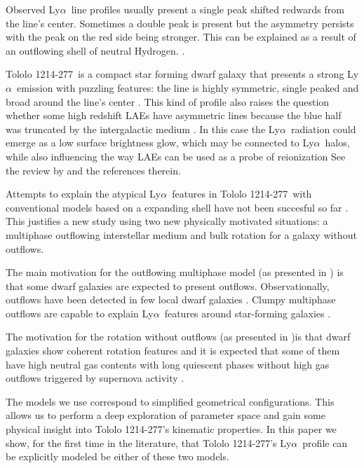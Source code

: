 \documentclass[a4,useAMS,usenatbib,usegraphicx]{mn2e}
\newcommand{\tol}{Tololo 1214-277}
\newcommand{\lya}{Ly$\alpha$}
\begin{document}
Observed \lya\ line profiles usually present a single peak shifted
redwards from the line's center. 
Sometimes a double peak is present but the asymmetry persists with 
the peak on the red side being stronger. 
This can be explained as a result of an outflowing shell of neutral Hydrogen.
\citep{2006A&A...460..397V,Orsi12,2012ApJ...751...29Y,2015ApJ...812..123G}.

\tol\ is a compact star forming dwarf galaxy that presents a
strong \lya\ emission with puzzling 
features: the line is highly symmetric, single peaked and broad around the
line's center \citep{Thuan97}.
This kind of profile also raises the question whether some high
redshift LAEs have asymmetric lines because the blue half was
truncated by the intergalactic medium \citep{2007MNRAS.377.1175D}. 
In this case the \lya\ radiation could emerge as a low surface
brightness glow, which may be connected to \lya\ halos, while also
influencing the way LAEs can be used as a probe of reionization
See the review by \cite{2014PASA...31...40D} and the references therein.

Attempts to explain the atypical \lya\ features in \tol\ with
conventional models based on a expanding shell have not been succesful
so far \citep{mashesse03,2015A&A...578A...7V}. 
This justifies a new study using two new physically motivated
situations: a multiphase outflowing interstellar medium and bulk rotation for a
galaxy without outflows.

The main motivation for the outflowing multiphase model (as presented
in \cite{Gronke2016}) is that some dwarf galaxies are expected to
present outflows.  
Observationally, outflows have been detected in few local dwarf galaxies
\citep{1998ApJ...506..222M,2005MNRAS.358.1453O}. 
Clumpy multiphase outflows are capable to explain \lya\ features around
star-forming galaxies
\citep{2010ApJ...717..289S,2012MNRAS.424.1672D}. 


The motivation for the rotation without outflows (as presented in \cite{GaravitoCamargo2014})is that
dwarf galaxies show coherent rotation features
\citep{2009A&A...493..871S} and it is expected that some of them have
high neutral gas contents with long quiescent phases without high gas
outflows triggered by supernova activity
\citep{2005A&A...433L...1B,2008ApJ...672..888T,2013MNRAS.434.2491G}.  



The models we use correspond to simplified geometrical configurations.
This allows us to perform a deep exploration of parameter space and
gain some physical insight into \tol's kinematic properties.
In this paper we show, for the first time in the literature, that \tol's
\lya\ profile can be explicitly modeled be either of these two
models. 
\end{document}
